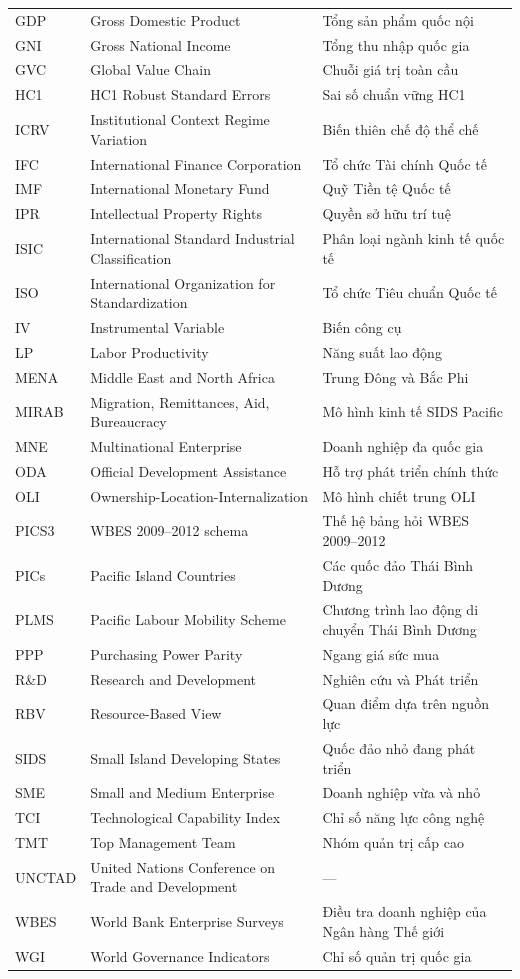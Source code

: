 \documentclass[12pt,a4paper]{article}
\begin{document}
\begin{longtable}[]{@{}lll@{}}
GDP & Gross Domestic Product & Tổng sản phẩm quốc nội \\
GNI & Gross National Income & Tổng thu nhập quốc gia \\
GVC & Global Value Chain & Chuỗi giá trị toàn cầu \\
HC1 & HC1 Robust Standard Errors & Sai số chuẩn vững HC1 \\
ICRV & Institutional Context Regime Variation & Biến thiên chế độ thể
chế \\
IFC & International Finance Corporation & Tổ chức Tài chính Quốc tế \\
IMF & International Monetary Fund & Quỹ Tiền tệ Quốc tế \\
IPR & Intellectual Property Rights & Quyền sở hữu trí tuệ \\
ISIC & International Standard Industrial Classification & Phân loại
ngành kinh tế quốc tế \\
ISO & International Organization for Standardization & Tổ chức Tiêu
chuẩn Quốc tế \\
IV & Instrumental Variable & Biến công cụ \\
LP & Labor Productivity & Năng suất lao động \\
MENA & Middle East and North Africa & Trung Đông và Bắc Phi \\
MIRAB & Migration, Remittances, Aid, Bureaucracy & Mô hình kinh tế SIDS
Pacific \\
MNE & Multinational Enterprise & Doanh nghiệp đa quốc gia \\
ODA & Official Development Assistance & Hỗ trợ phát triển chính thức \\
OLI & Ownership-Location-Internalization & Mô hình chiết trung OLI \\
PICS3 & WBES 2009--2012 schema & Thế hệ bảng hỏi WBES 2009--2012 \\
PICs & Pacific Island Countries & Các quốc đảo Thái Bình Dương \\
PLMS & Pacific Labour Mobility Scheme & Chương trình lao động di chuyển
Thái Bình Dương \\
PPP & Purchasing Power Parity & Ngang giá sức mua \\
R\&D & Research and Development & Nghiên cứu và Phát triển \\
RBV & Resource-Based View & Quan điểm dựa trên nguồn lực \\
SIDS & Small Island Developing States & Quốc đảo nhỏ đang phát triển \\
SME & Small and Medium Enterprise & Doanh nghiệp vừa và nhỏ \\
TCI & Technological Capability Index & Chỉ số năng lực công nghệ \\
TMT & Top Management Team & Nhóm quản trị cấp cao \\
UNCTAD & United Nations Conference on Trade and Development & --- \\
WBES & World Bank Enterprise Surveys & Điều tra doanh nghiệp của Ngân
hàng Thế giới \\
WGI & World Governance Indicators & Chỉ số quản trị quốc gia \\
\end{longtable}
\end{document}

